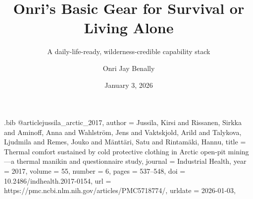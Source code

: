 \begin{filecontents*}{\jobname.bib}
@article{jussila_arctic_2017,
  author       = {Jussila, Kirsi and Rissanen, Sirkka and Aminoff, Anna and Wahlstr{\"o}m, Jens and Vaktskjold, Arild and Talykova, Ljudmila and Remes, Jouko and M{\"a}ntt{\"a}ri, Satu and Rintam{\"a}ki, Hannu},
  title        = {Thermal comfort sustained by cold protective clothing in Arctic open-pit mining---a thermal manikin and questionnaire study},
  journal      = {Industrial Health},
  year         = {2017},
  volume       = {55},
  number       = {6},
  pages        = {537--548},
  doi          = {10.2486/indhealth.2017-0154},
  url          = {https://pmc.ncbi.nlm.nih.gov/articles/PMC5718774/},
  urldate      = {2026-01-03},
}

\end{filecontents*}

\documentclass[aspectratio=169]{beamer}

\title[Basic Gear: Survival or Living Alone]{Onri's Basic Gear for Survival or Living Alone}
\subtitle{A daily-life-ready, wilderness-credible capability stack}
\author{Onri Jay Benally}
\date{January 3, 2026}



\usepackage{fontspec}
\usepackage{booktabs}
\usepackage{tabularx}
\usepackage{ragged2e}
\setlength{\emergencystretch}{2em}
\sloppy
\usepackage{siunitx}
\usepackage{hyperref}
\usepackage{adjustbox}
\usepackage{alltt}
\usepackage{multirow}
\usepackage{dirtree}
\usepackage{enumitem}
\usepackage{tikz}
\usetikzlibrary{calc,positioning,fit,backgrounds,arrows.meta}

\usepackage[backend=biber,style=ieee]{biblatex}


\renewcommand\familydefault{\sfdefault}

